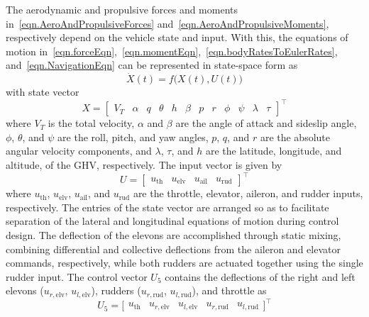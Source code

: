 The aerodynamic and propulsive forces and moments in\ \eqref{eqn.AeroAndPropulsiveForces} and\ \eqref{eqn.AeroAndPropulsiveMoments}, respectively depend on the vehicle state and input.
With this, the equations of motion in\ \eqref{eqn.forceEqn},\ \eqref{eqn.momentEqn},\ \eqref{eqn.bodyRatesToEulerRates}, and\ \eqref{eqn.NavigationEqn} can be represented in state-space form as
\begin{equation}
  \label{eqn.nonlinearStateSpace}
  \dot{X}(t) = f\bigr({X}(t), U(t)\bigr)
\end{equation}
with state vector
\begin{equation}
  \label{eqn.fullstatevectorx}
  X=\left[
  \begin{array}{cccccccccccc}
    V_{T} &  \alpha & q &\theta & h & \beta &p & r & \phi &\psi &\lambda & \tau
  \end{array}\right]^{\top}
\end{equation}
where $V_{T}$ is the total velocity, $\alpha$ and $\beta$ are the angle of attack and sideslip angle, $\phi$, $\theta$, and $\psi$ are the roll, pitch, and yaw angles, $p$, $q$, and $r$ are the absolute angular velocity components, and $\lambda$, $\tau$, and $h$ are the latitude, longitude, and altitude, of the GHV, respectively.
The input vector is given by
\begin{equation}
  \label{eqn.fullcontrolvector}
  U=\left[
  \begin{array}{cccc}
    u_{\text{th}} & u_{\text{elv}} & u_{\text{ail}} & u_{\text{rud}}
  \end{array}\right]^{\top}
\end{equation}
where $u_{\text{th}}$, $u_{\text{elv}}$, $u_{\text{ail}}$, and $u_{\text{rud}}$ are the throttle, elevator, aileron, and rudder inputs, respectively.
The entries of the state vector are arranged so as to facilitate separation of the lateral and longitudinal equations of motion during control design.
The deflection of the elevons are accomplished through static mixing, combining differential and collective deflections from the aileron and elevator commands, respectively, while both rudders are actuated together using the single rudder input.
The control vector $U_{5}$ contains the deflections of the right and left elevons ($u_{r,\text{elv}}$, $u_{l,\text{elv}}$), rudders ($u_{r,\text{rud}}$, $u_{l,\text{rud}}$), and throttle as
\begin{equation*}
  U_{5}=
  \bigr[
  \begin{array}{ccccc}
    u_{\text{th}} & u_{r,\text{elv}} & u_{l,\text{elv}} & u_{r,\text{rud}}  & u_{l,\text{rud}}
  \end{array}\bigr]^{\top}
\end{equation*}
